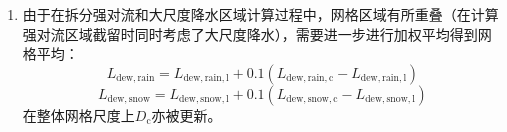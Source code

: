 \begin{enumerate}
  \item 由于在拆分强对流和大尺度降水区域计算过程中，网格区域有所重叠（在计算强对流区域截留时同时考虑了大尺度降水），需要进一步进行加权平均得到网格平均：
%
    \begin{equation}
        L_{\mathrm{dew,rain}}  = L_{\mathrm{dew,rain,l}} + 0.1(L_{\mathrm{dew,rain,c}} - L_{\mathrm{dew,rain,l}}) 
    \end{equation}
    \begin{equation}
        L_{\mathrm{dew,snow}}  = L_{\mathrm{dew,snow,l}} + 0.1(L_{\mathrm{dew,snow,c}} - L_{\mathrm{dew,snow,l}}) 
    \end{equation}
%
    在整体网格尺度上$D_{\mathrm {c}} $亦被更新。

\end{enumerate}

